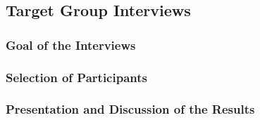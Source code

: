 \newpage
\subsection{Target Group Interviews}

\subsubsection{Goal of the Interviews}

\subsubsection{Selection of Participants}

\subsubsection{Presentation and Discussion of the Results}

